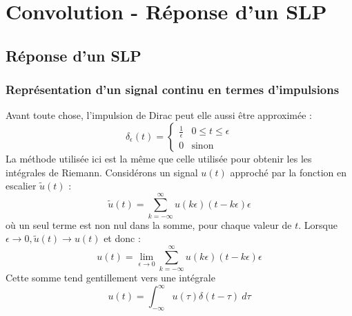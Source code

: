 \chapter{Convolution - Réponse d'un SLP}
\section{Réponse d'un SLP}
	\subsection{Représentation d'un signal continu en termes d'impulsions}
	Avant toute chose, l'impulsion de Dirac peut elle aussi \^etre approximée :
	\begin{equation}
	\delta_\epsilon(t) = \left\{\begin{array}{ll}
	\frac{1}{\epsilon} & 0\leq t \leq \epsilon\\
	0 & \text{sinon}
	\end{array}\right.
	\end{equation}
	La méthode utilisée ici est la m\^eme que celle utilisée pour obtenir les 
	les intégrales de Riemann. Considérons un signal $u(t)$ approché par la 
	fonction en escalier $\tilde{u}(t)$ :
	\begin{equation}
	\tilde{u}(t) = \sum_{k=-\infty}^\infty u(k\epsilon)(t-k\epsilon)\epsilon
	\end{equation}
	où un seul terme est non nul dans la somme, pour chaque valeur de $t$. 
	Lorsque $\epsilon\rightarrow 0, \tilde{u}(t) \rightarrow u(t)$ et donc :
	\begin{equation}
	u(t) = \lim\limits_{\epsilon\rightarrow 0} \sum_{k=-\infty}^\infty u(k
	\epsilon)(t-k\epsilon)\epsilon
	\end{equation}
	Cette somme tend gentillement vers une intégrale 
	\begin{equation}
	u(t) = \int_{-\infty}^\infty u(\tau)\delta(t-\tau)\ d\tau
	\end{equation}



